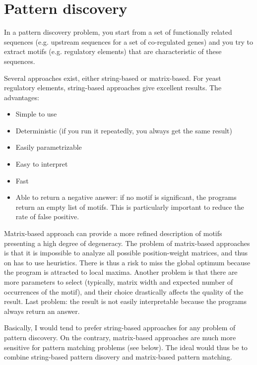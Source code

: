 \section{Pattern discovery}

In a pattern discovery problem, you start from a set of
functionally related sequences (e.g.  upstream sequences for a set of
co-regulated genes) and you try to extract motifs (e.g. regulatory
elements) that are characteristic of these sequences.

Several approaches exist, either string-based or matrix-based. For
yeast regulatory elements, string-based approaches give excellent
results. The advantages:

\begin{itemize}
\item Simple to use
\item Deterministic (if you run it repeatedly, you always get the same result)
\item Easily parametrizable
\item Easy to interpret
\item Fast
\item Able to return a negative answer: if no motif is significant,
the programs return an empty list of motifs. This is particularly
important to reduce the rate of false positive.
\end{itemize}

Matrix-based approach can provide a more refined description of motifs
presenting a high degree of degeneracy. The problem of matrix-based
approaches is that it is impossible to analyze all possible
position-weight matrices, and thus on has to use heuristics. There is
thus a risk to miss the global optimum because the program is
attracted to local maxima. Another problem is that there are more
parameters to select (typically, matrix width and expected number of
occurrences of the motif), and their choice drastically affects the
quality of the result. Last problem: the result is not easily
interpretable because the programs always return an answer.

Basically, I would tend to prefer string-based approaches for any
problem of pattern discovery. On the contrary, matrix-based approaches
are much more sensitive for pattern matching problems (see below). The
ideal would thus be to combine string-based pattern disovery and
matrix-based pattern matching.

